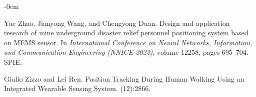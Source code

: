 \documentclass[engproc,conferenceproceedings,submit,pdftex,moreauthors]{Definitions/mdpi}
\begin{document}
\begin{adjustwidth}{-\extralength}{0cm}
\begin{thebibliography}{999}
Yue Zhao, Jianyong Wang, and Chengyong Duan.
\newblock Design and application research of mine underground disaster relief
personnel positioning system based on {{MEMS}} sensor.
\newblock In {\em International {{Conference}} on {{Neural Networks}},
	{{Information}}, and {{Communication Engineering}} ({{NNICE}} 2022)}, volume
12258, pages 695--704. {SPIE}.

Giulio Zizzo and Lei Ren.
\newblock Position {{Tracking During Human Walking Using}} an {{Integrated
		Wearable Sensing System}}.
(12):2866.
\end{thebibliography}

%


\PublishersNote{}
\end{adjustwidth}
\end{document}
